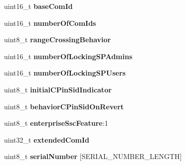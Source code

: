 \begin{DoxyCompactItemize}
\item 
\hypertarget{structsedContext_ab949b4a15dea2a97523a949deaf59db8}{}uint16\+\_\+t {\bfseries base\+Com\+Id}\label{structsedContext_ab949b4a15dea2a97523a949deaf59db8}

\item 
\hypertarget{structsedContext_abe43f3880eec3eaca38d8e83e2512d0f}{}uint16\+\_\+t {\bfseries number\+Of\+Com\+Ids}\label{structsedContext_abe43f3880eec3eaca38d8e83e2512d0f}

\item 
\hypertarget{structsedContext_a242c0cc118f5aff19f45806336833ac5}{}uint8\+\_\+t {\bfseries range\+Crossing\+Behavior}\label{structsedContext_a242c0cc118f5aff19f45806336833ac5}

\item 
\hypertarget{structsedContext_ac1c11f67aee656627535fa66b16b3236}{}uint16\+\_\+t {\bfseries number\+Of\+Locking\+S\+P\+Admins}\label{structsedContext_ac1c11f67aee656627535fa66b16b3236}

\item 
\hypertarget{structsedContext_acf173b63a98dcc66391303c9b6c19d67}{}uint16\+\_\+t {\bfseries number\+Of\+Locking\+S\+P\+Users}\label{structsedContext_acf173b63a98dcc66391303c9b6c19d67}

\item 
\hypertarget{structsedContext_acaca392ff61e94d991d6638090cb31df}{}uint8\+\_\+t {\bfseries initial\+C\+Pin\+Sid\+Indicator}\label{structsedContext_acaca392ff61e94d991d6638090cb31df}

\item 
\hypertarget{structsedContext_a90fa673003ed37baca1ff53563a5ec06}{}uint8\+\_\+t {\bfseries behavior\+C\+Pin\+Sid\+On\+Revert}\label{structsedContext_a90fa673003ed37baca1ff53563a5ec06}

\item 
\hypertarget{structsedContext_a11349cdd24ed0e0fbc193c0b39e7d17d}{}uint8\+\_\+t {\bfseries enterprise\+Ssc\+Feature}\+:1\label{structsedContext_a11349cdd24ed0e0fbc193c0b39e7d17d}

\item 
\hypertarget{structsedContext_aaf781a97a12fc6a736b834fdfd14a8ef}{}uint32\+\_\+t {\bfseries extended\+Com\+Id}\label{structsedContext_aaf781a97a12fc6a736b834fdfd14a8ef}

\item 
\hypertarget{structsedContext_a8a7fbbdf698b327911fcfb8bf26f8a89}{}uint8\+\_\+t {\bfseries serial\+Number} \mbox{[}S\+E\+R\+I\+A\+L\+\_\+\+N\+U\+M\+B\+E\+R\+\_\+\+L\+E\+N\+G\+T\+H\mbox{]}\label{structsedContext_a8a7fbbdf698b327911fcfb8bf26f8a89}


\end{DoxyCompactItemize}
